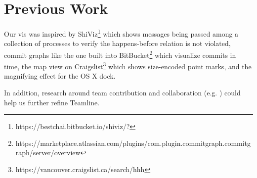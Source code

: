 \documentclass[preprint,journal]{vgtc}       %
\begin{document}
\section{Previous Work}
Our vis was inspired by ShiViz\footnote{https://bestchai.bitbucket.io/shiviz/?} which shows messages being passed among
a collection of processes to verify the happens-before relation is not violated,
commit graphs like the one built into BitBucket\footnote{https://marketplace.atlassian.com/plugins/com.plugin.commitgraph.commitgraph/server/overview}
which visualize commits in time, the map view on Craigslist\footnote{https://vancouver.craigslist.ca/search/hhh} which shows size-encoded point marks, and the magnifying effect for the OS X dock.

In addition, research around team contribution and collaboration (e.g. \cite{Kelly:2016}) could help us further refine Teamline.


%
%



%
%
%
%


\end{document}
